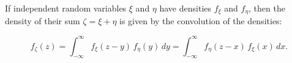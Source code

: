 If independent random variables $\xi$ and $\eta$ have densities $f_\xi$ and $f_\eta$, then the density of their sum $\zeta = \xi + \eta$ is given by the convolution of the densities:

$$f_\zeta(z) = \int_{-\infty}^{\infty} f_\xi(z - y) \, f_\eta(y) \, dy = \int_{-\infty}^{\infty} f_\eta(z - x) \, f_\xi(x) \, dx.$$

